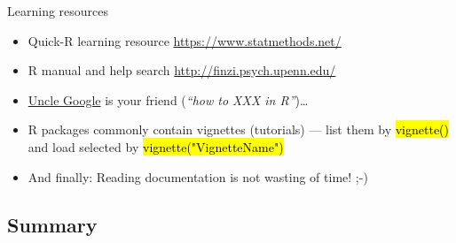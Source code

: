 \documentclass[compress, ucs, xelatex, 11pt, xcolor=svgnames,
  hyperref={
    bookmarks=true,
    unicode=true,
    colorlinks=true,
    pdftitle={Molecular data in R},
    plainpages=false,
    pdfauthor={Vojtech Zeisek},
    pdfsubject={Course about phylogeny and evolution in R},
    pdfcreator={XeLaTeX},
    pdfkeywords={R, evolution, phylogeny, molecular data},
    linkcolor=Tomato,
    anchorcolor=SaddleBrown,
    citecolor=Goldenrod,
    filecolor=DarkMagenta,
    menucolor=Sienna,
    urlcolor=DarkTurquoise,
    pdftex},
  url={hyphens, lowtilde} %
  ]{beamer}
\renewcommand{\texttt}[1]{\hl{\ttfamily #1}}
\begin{document}
\begin{frame}[allowframebreaks]{Learning resources}
\begin{itemize}
    \item Quick-R learning resource \url{https://www.statmethods.net/}
    \item R manual and help search \url{http://finzi.psych.upenn.edu/}
    \item \href{http://rseek.org/}{Uncle Google} is your friend (\textit{``how to XXX in R''})\ldots
    \item R packages commonly contain vignettes (tutorials) --- list them by \texttt{vignette()} and load selected by \texttt{vignette("VignetteName")}
    \item And finally: \alert{Reading documentation is not wasting of time!} ;-)
  \end{itemize}
\end{frame}

\subsection{Summary}
\end{document}
